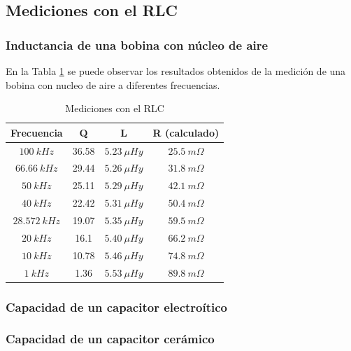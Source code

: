 \documentclass[a4paper,10pt]{article}
\begin{document}
		\subsection{Mediciones con el RLC}		
		
		\subsubsection{Inductancia de una bobina con n\'ucleo de aire}
		En la Tabla \ref{tabRLCbobina} se puede observar los resultados obtenidos de la medici\'on de una bobina con nucleo de aire a diferentes frecuencias.
		\begin{table}[!htp]
					\centering
					\begin{tabular}{|c|c|c|c|}
						\hline
			    		Frecuencia & Q & L  & R (calculado) \\
						\hline
						$100~kHz$& 36.58 & $5.23~\mu Hy$ &$ 25.5~m\Omega$ \\
						\hline
						$66.66~kHz$& 29.44 & $5.26~\mu Hy$ &$ 31.8~m\Omega$ \\
						\hline
						$50~kHz$& 25.11 & $5.29~\mu Hy$ &$ 42.1~m\Omega$ \\
						\hline  
						$40~kHz$& 22.42 & $5.31~\mu Hy$ &$ 50.4~m\Omega$ \\
						\hline  										
						$28.572~kHz$& 19.07 & $5.35~\mu Hy$ &$ 59.5~m\Omega$ \\
						\hline
						$20~kHz$& 16.1 & $5.40~\mu Hy$ &$ 66.2~m\Omega$ \\
						\hline  
						$10~kHz$& 10.78 & $5.46~\mu Hy$ &$ 74.8~m\Omega$ \\
						\hline 										
						$1~kHz$& 1.36 & $5.53~\mu Hy$ &$ 89.8~m\Omega$ \\
						\hline 	  
					\end{tabular}
					\caption{Mediciones con el RLC} \label{tabRLCbobina}
				\end{table}
						
		\subsubsection{Capacidad de un capacitor electro\'itico}	
		\subsubsection{Capacidad de un capacitor cer\'amico}
		
\end{document}
